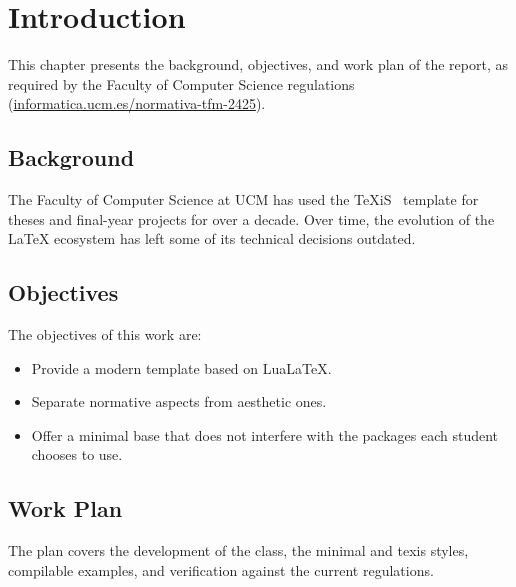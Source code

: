 \chapter{Introduction}

This chapter presents the background, objectives, and work plan of
the report, as required by the Faculty of Computer Science regulations
(\href{https://informatica.ucm.es/normativa-tfm-2425}{informatica.ucm.es/normativa-tfm-2425}).

\section{Background}

The Faculty of Computer Science at UCM has used the TeXiS~\cite{texis}
template for theses and final-year projects for over a decade. Over
time, the evolution of the \LaTeX{} ecosystem has left some of its
technical decisions outdated.

\section{Objectives}

The objectives of this work are:
\begin{itemize}
  \item Provide a modern template based on Lua\LaTeX.
  \item Separate normative aspects from aesthetic ones.
  \item Offer a minimal base that does not interfere with the
        packages each student chooses to use.
\end{itemize}

\section{Work Plan}

The plan covers the development of the class, the minimal and texis
styles, compilable examples, and verification against the current
regulations.

